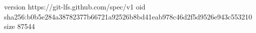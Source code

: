 version https://git-lfs.github.com/spec/v1
oid sha256:b0b5e284a38782377b66721a92526b8bd41eab978c46d2f5d9526e943c553210
size 87544
